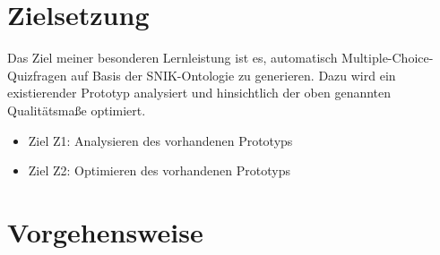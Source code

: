 \documentclass[headsepline,titlepage,ngerman,twoside,12pt]{report}
\newcommand\todo[1]{}%
\begin{document}
\todo{
\begin{itemize}
\item Warum lohnt es sich, die genannten Probleme zu lösen?
\item Wer wird welchen Nutzen von dieser Abschlussarbeit haben?
\item Warum sind die Papers wichtig?
\end{itemize}
Aus den Papers bzw. dem Antrag des Forschungsprojektes entnehmen.
}
\todo{
Worin liegt der zusätzliche Nutzen, die beiden Ansätze zu vergleichen? Worin liegt der Nutzen, den Ansatz des Papers auf die Problematik des Forschungsprojektes anzuwenden?\\
Bsp.: Gelänge es, Daten aus der Krankenversorgung vollständig zu anonymisieren, könnten sie für beliebige Forschungsvorhaben genutzt werden.
}

\section{Zielsetzung}
\label{sec:Ziele}
Das Ziel meiner besonderen Lernleistung ist es, automatisch Multiple-Choice-Quizfragen auf Basis der SNIK-Ontologie zu generieren. 
Dazu wird ein existierender Prototyp analysiert und hinsichtlich der oben genannten Qualitätsmaße optimiert.
\begin{itemize}
\item Ziel Z1: Analysieren des vorhandenen Prototyps
\item Ziel Z2: Optimieren des vorhandenen Prototyps
\end{itemize}

\section{Vorgehensweise}
\label{sec:Vorgehen}
\todo{
Stellen Sie Ihre Methode bzw. Herangehensweise dar.
Was ist Ihre konkrete Aufgabenstellung im Rahmen der Seminararbeit? Das könnte z.B. sein:
\begin{itemize}
\item Vorstellen verschiedener Lösungsansätze, Vergleich und Bewertung der Lösungsansätze, Literaturrecherche nach weiteren vergleichbaren Papers.
\item Bewertung eines Lösungsansatzes hinsichtlich einer konkreten Forschungssituation.
Literaturrecherche nach weiteren vergleichbaren Papers.
\end{itemize}
}
\end{document}
